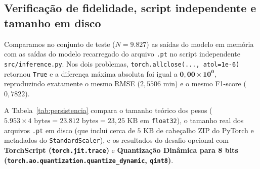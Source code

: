 \documentclass[12pt,a4paper]{article}
\begin{document}
\subsection{Verificação de fidelidade, script independente e tamanho em disco}

Comparamos no conjunto de teste ($N = 9.827$) as saídas do modelo em memória com as saídas do modelo recarregado do arquivo \texttt{.pt} no script independente \texttt{src/inference.py}. Nos dois problemas, \texttt{torch.allclose(..., atol=1e-6)} retornou \texttt{True} e a diferença máxima absoluta foi igual a $\mathbf{0{,}00 \times 10^0}$, reproduzindo exatamente o mesmo RMSE ($2{,}5506\text{ min}$) e o mesmo F1-score ($0{,}7822$).

A Tabela~\ref{tab:persistencia} compara o tamanho teórico dos pesos ($5.953 \times 4\text{ bytes} = 23.812\text{ bytes} = 23{,}25\text{ KB}$ em \texttt{float32}), o tamanho real dos arquivos \texttt{.pt} em disco (que inclui cerca de $5\text{ KB}$ de cabeçalho ZIP do PyTorch e metadados do \texttt{StandardScaler}), e os resultados do desafio opcional com \textbf{TorchScript (\texttt{torch.jit.trace})} e \textbf{Quantização Dinâmica para 8 bits (\texttt{torch.ao.quantization.quantize\_dynamic}, \texttt{qint8})}.

\begin{table}[H]
\centering
\caption{Comparação de tamanho em disco, latência em lote e fidelidade da métrica no teste (Notebook 06)}
\label{tab:persistencia}
\footnotesize
{}
\end{table}
\end{document}
